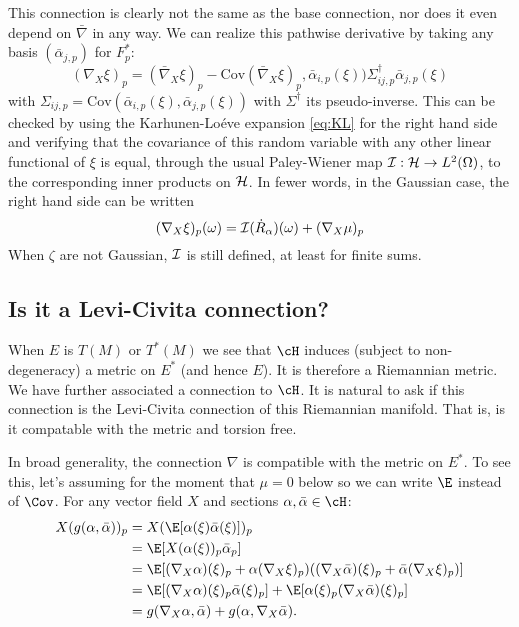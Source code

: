 \documentclass{article}
\begin{document}
This connection is clearly not the same as the base connection, nor
does it even depend on $\bar{\nabla}$ in any way. We can realize this pathwise derivative by
taking any basis $(\bar{\alpha}_{j,p})$ for $F_p^*$:
\begin{equation}
\label{eq:pathwise:1}
(\nabla_X\xi)_p = (\bar{\nabla}_X\xi)_p - \text{Cov}(\bar{\nabla}_X\xi)_p, \bar{\alpha}_{i,p}(\xi))
  \Sigma^{\dagger}_{ij,p} \bar{\alpha}_{j,p}(\xi)
\end{equation}
with $\Sigma_{ij,p} = \text{Cov}(\bar{\alpha}_{i,p}(\xi),
\bar{\alpha}_{j,p}(\xi))$ with $\Sigma^{\dagger}$ its pseudo-inverse.
This can be checked by using the Karhunen-Lo\'eve expansion
\eqref{eq:KL} for the right hand side and verifying that the
covariance of this random variable with any other linear functional of
$\xi$ is equal, through the usual Paley-Wiener map ${\cal I}:{\cal H}
\to L^2(\Omega)$, to the corresponding inner products on ${\cal
  H}$. In fewer words, in the Gaussian case, the right hand side can be written
\begin{equation}
  \label{eq:pathwise:2}
(\nabla_X\xi)_p(\omega) = {\cal I}(\dot{R}_{\alpha})(\omega) + (\nabla_X \mu)_p
\end{equation}
When $\zeta$ are not Gaussian, ${\cal I}$ is still defined, at least for finite sums.

\subsection{Is it a Levi-Civita connection?}

When $E$ is $T(M)$ or $T^*(M)$ we see that $\cH$ induces (subject to non-degeneracy) a metric on
$E^*$ (and hence $E$). It is therefore a Riemannian metric. We have further associated a
connection to $\cH$. It is natural to ask if this connection is the Levi-Civita connection
of this Riemannian manifold. That is, is it compatable with the metric and torsion free.

In broad generality, the connection $\nabla$ is compatible with the metric on $E^*$.
To see this, let's assuming for the moment that $\mu=0$ below so we can write $\E$ instead of $\Cov$.
For any vector field $X$ and sections $\alpha, \bar{\alpha} \in \cH$:
$$
\begin{aligned}
  X(g(\alpha, \bar{\alpha}))_p &= X(\E[\alpha(\xi) \bar{\alpha}(\xi)])_p \\
  &= \E[X(\alpha(\xi))_p \bar{\alpha}_p] \\
  &= \E[(\nabla_X\alpha)(\xi)_p + \alpha(\nabla_X\xi)_p)((\nabla_X\bar{\alpha})(\xi)_p + \bar{\alpha}(\nabla_X\xi)_p)] \\
  &= \E[(\nabla_X\alpha)(\xi)_p \bar{\alpha}(\xi)_p] + \E[\alpha(\xi)_p (\nabla_X\bar{\alpha})(\xi)_p] \\
  &= g(\nabla_X\alpha, \bar{\alpha}) + g(\alpha, \nabla_X\bar{\alpha}).
\end{aligned}
$$
\end{document}
